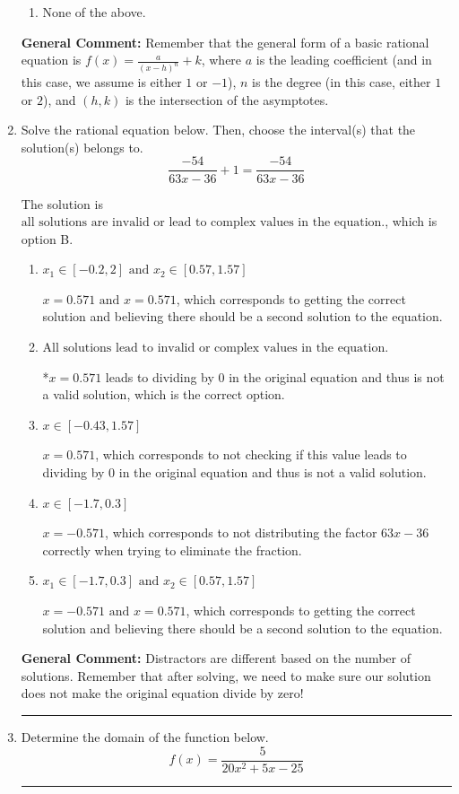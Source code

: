 \documentclass{extbook}[14pt]
\newcommand{\litem}[1]{\item #1

\rule{\textwidth}{0.4pt}}
\begin{document}
\begin{enumerate}
{\begin{enumerate}[label=\Alph*.]
\begin{multicols}{2}
\end{multicols}\item None of the above.\end{enumerate}
\textbf{General Comment:} Remember that the general form of a basic rational equation is $ f(x) = \frac{a}{(x-h)^n} + k$, where $a$ is the leading coefficient (and in this case, we assume is either $1$ or $-1$), $n$ is the degree (in this case, either $1$ or $2$), and $(h, k)$ is the intersection of the asymptotes.
}
\litem{
Solve the rational equation below. Then, choose the interval(s) that the solution(s) belongs to.
\[ \frac{-54}{63x -36} + 1 = \frac{-54}{63x -36} \]

The solution is \( \text{all solutions are invalid or lead to complex values in the equation.} \), which is option B.\begin{enumerate}[label=\Alph*.]
\item \( x_1 \in [-0.2, 2] \text{ and } x_2 \in [0.57,1.57] \)

$x = 0.571 \text{ and } x = 0.571$, which corresponds to getting the correct solution and believing there should be a second solution to the equation.
\item \( \text{All solutions lead to invalid or complex values in the equation.} \)

*$x = 0.571$ leads to dividing by 0 in the original equation and thus is not a valid solution, which is the correct option.
\item \( x \in [-0.43,1.57] \)

$x = 0.571$, which corresponds to not checking if this value leads to dividing by 0 in the original equation and thus is not a valid solution.
\item \( x \in [-1.7,0.3] \)

$x = -0.571$, which corresponds to not distributing the factor $63x -36$ correctly when trying to eliminate the fraction.
\item \( x_1 \in [-1.7, 0.3] \text{ and } x_2 \in [0.57,1.57] \)

$x = -0.571 \text{ and } x = 0.571$, which corresponds to getting the correct solution and believing there should be a second solution to the equation.
\end{enumerate}

\textbf{General Comment:} Distractors are different based on the number of solutions. Remember that after solving, we need to make sure our solution does not make the original equation divide by zero!
}
\litem{
Determine the domain of the function below.
\[ f(x) = \frac{5}{20x^{2} +5 x -25} \]

}
\end{enumerate}
\end{document}
